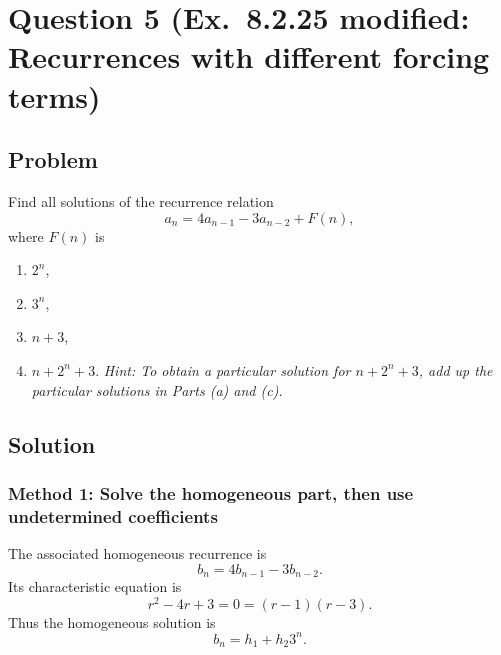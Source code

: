 \documentclass[12pt]{article}
\begin{document}
\newpage

\section{Question 5 (Ex.\ 8.2.25 modified: Recurrences with different forcing terms)}

\subsection{Problem}
Find all solutions of the recurrence relation
\[
a_n=4a_{n-1}-3a_{n-2}+F(n),
\]
where \(F(n)\) is
\begin{enumerate}[label=(\alph*)]
\item \(2^n\),
\item \(3^n\),
\item \(n+3\),
\item \(n+2^n+3\). \hfill
\textit{Hint: To obtain a particular solution for \(n+2^n+3\), add up the particular solutions in Parts (a) and (c).}
\end{enumerate}

\subsection{Solution}

\subsubsection{Method 1: Solve the homogeneous part, then use undetermined coefficients}
The associated homogeneous recurrence is
\[
b_n=4b_{n-1}-3b_{n-2}.
\]
Its characteristic equation is
\[
r^2-4r+3=0=(r-1)(r-3).
\]
Thus the homogeneous solution is
\[
b_n=h_1+h_2 3^n.
\]
\end{document}
